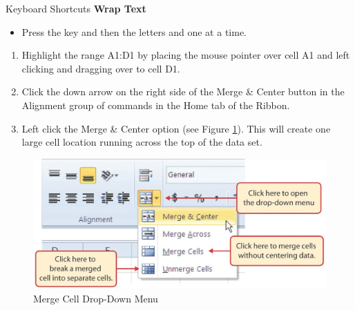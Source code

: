 \begin{center}
	\begin{shtcutbox}{Keyboard Shortcuts}
		\textbf{Wrap Text}
		\\
		\begin{itemize}
			\setlength{\itemsep}{0pt}
			\setlength{\parskip}{0pt}
			\setlength{\parsep}{0pt}
			
			\item Press the  key and then the letters  and  one at a time.
			
		\end{itemize}
	\end{shtcutbox}
\end{center}

\begin{enumerate}[resume]
	\item Highlight the range \textsf{A1:D1} by placing the mouse pointer over cell A1 and left clicking and dragging over to cell \textsf{D1}.
	\item Click the down arrow on the right side of the Merge \& Center button in the Alignment group of commands in the Home tab of the Ribbon.
	\item Left click the Merge \& Center option (see Figure \ref{01:fig39}). This will create one large cell location running across the top of the data set.

\end{enumerate}

\begin{figure}[H]
	\centering
	\includegraphics[width=\maxwidth{.95\linewidth}]{gfx/ch01_fig39}
	\caption{Merge Cell Drop-Down Menu}
	\label{01:fig39}
\end{figure}

